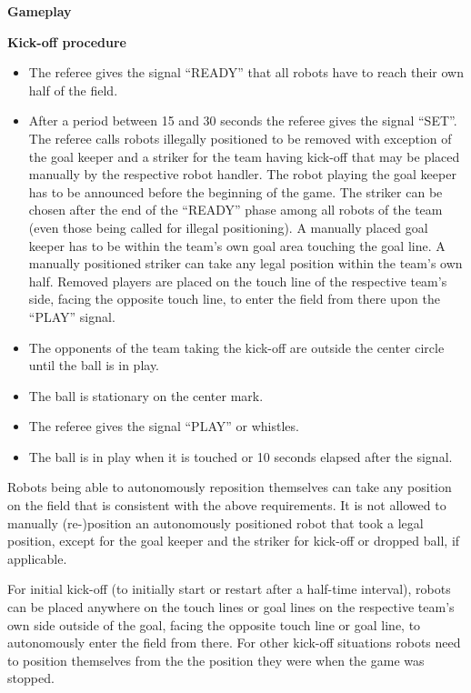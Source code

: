 \clearpage
{\bfseries Gameplay}

\headlinebox
 
{\bfseries Kick-off procedure}

\begin{itemize}
\item The referee gives the signal ``READY'' that all robots have to reach their own half of the field. 
\item After a period between 15 and 30 seconds the referee gives the signal ``SET''. The referee calls robots illegally positioned to be removed with exception of the goal keeper and a striker for the team having kick-off that may be placed manually by the respective robot handler. The robot playing the goal keeper has to be announced before the beginning of the game. The striker can be chosen after the end of the ``READY'' phase among all robots of the team (even those being called for illegal positioning). A manually placed goal keeper has to be within the team's own goal area touching the goal line. A manually positioned striker can take any legal position within the team's own half. Removed players are placed on the touch line of the respective team's side, facing the opposite touch line, to enter the field from there upon the ``PLAY'' signal. 
\item The opponents of the team taking the kick-off are outside the center circle until the ball is in play.
\item The ball is stationary on the center mark. 
\item The referee gives the signal ``PLAY'' or whistles.
\item The ball is in play when it is touched or 10 seconds elapsed after the signal.
\end{itemize}

Robots being able to autonomously reposition themselves can take any position on the field that is consistent with the above requirements. It is not allowed to manually (re-)position an autonomously positioned robot that took a legal position, except for the goal keeper and the striker for kick-off or dropped ball, if applicable.
 
For initial kick-off (to initially start or restart after a half-time interval), robots can be placed anywhere on the touch lines or goal lines on the respective team's own side outside of the goal, facing the opposite touch line or goal line, to autonomously enter the field from there. For other kick-off situations robots need to position themselves from the the position they were when the game was stopped.

